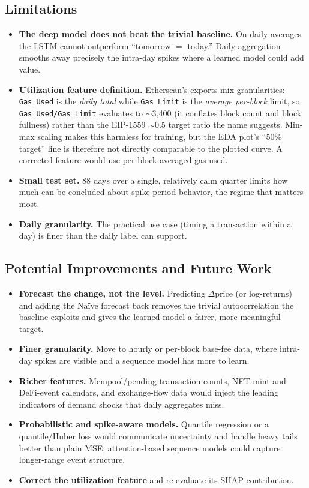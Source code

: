 \documentclass[11pt,a4paper]{article}
\begin{document}
\subsection{Limitations}
\begin{itemize}[leftmargin=1.4em]
\item \textbf{The deep model does not beat the trivial baseline.} On daily averages the LSTM
cannot outperform ``tomorrow $=$ today.'' Daily aggregation smooths away precisely the intra-day
spikes where a learned model could add value.
\item \textbf{Utilization feature definition.} Etherscan's exports mix granularities:
\texttt{Gas\_Used} is the \emph{daily total} while \texttt{Gas\_Limit} is the \emph{average
per-block} limit, so \texttt{Gas\_Used/Gas\_Limit} evaluates to $\sim$3{,}400 (it conflates block
count and block fullness) rather than the EIP-1559 $\sim$0.5 target ratio the name suggests.
Min-max scaling makes this harmless for training, but the EDA plot's ``50\% target'' line is
therefore not directly comparable to the plotted curve. A corrected feature would use
per-block-averaged gas used.
\item \textbf{Small test set.} 88 days over a single, relatively calm quarter limits how much can
be concluded about spike-period behavior, the regime that matters most.
\item \textbf{Daily granularity.} The practical use case (timing a transaction within a day) is
finer than the daily label can support.
\end{itemize}

\subsection{Potential Improvements and Future Work}
\begin{itemize}[leftmargin=1.4em]
\item \textbf{Forecast the change, not the level.} Predicting $\Delta$price (or log-returns) and
adding the Na\"ive forecast back removes the trivial autocorrelation the baseline exploits and
gives the learned model a fairer, more meaningful target.
\item \textbf{Finer granularity.} Move to hourly or per-block base-fee data, where intra-day
spikes are visible and a sequence model has more to learn.
\item \textbf{Richer features.} Mempool/pending-transaction counts, NFT-mint and DeFi-event
calendars, and exchange-flow data would inject the leading indicators of demand shocks that daily
aggregates miss.
\item \textbf{Probabilistic and spike-aware models.} Quantile regression or a quantile/Huber loss
would communicate uncertainty and handle heavy tails better than plain MSE; attention-based
sequence models could capture longer-range event structure.
\item \textbf{Correct the utilization feature} and re-evaluate its SHAP contribution.
\end{itemize}
\end{document}
